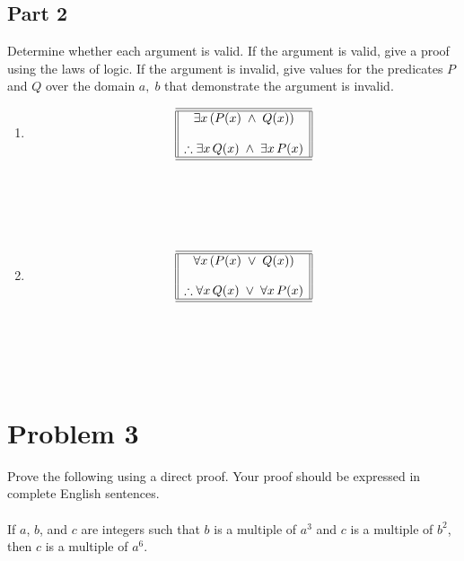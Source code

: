 \documentclass{amsart}
\theoremstyle{definition}
\theoremstyle{Exercise}
\theoremstyle{remark}
\theoremstyle{rule}
\numberwithin{equation}{section}
\begin{document}
 \subsection*{Part 2}
Determine whether each argument is valid. If the argument is valid, give a proof using the laws of logic. If the argument is invalid, give values for the predicates $P$ and $Q$ over the domain ${a,\; b}$ that demonstrate the argument is invalid.\\
 \begin{enumerate}[label=(\alph*)]
\item \[
\begin{array}{||c||}
\hline \hline
\exists x\, (P(x)\; \land \;Q(x) )\\
\\
\therefore \exists x\, Q(x)\; \land\; \exists x \,P(x) \\
\hline \hline
\end{array}
\]\\\\
 \\\\


\item \[
\begin{array}{||c||}
\hline \hline
\forall x\, (P(x)\; \lor \;Q(x) )\\
\\
\therefore \forall x\, Q(x)\; \lor \; \forall x\, P(x) \\
\hline \hline
\end{array}
\]\\\\
 \\\\
 \end{enumerate}
 \newpage


\section*{Problem 3}

Prove the following using a direct proof. Your proof should be expressed in complete English sentences.
\\\\

If $a$, $b$, and $c$ are integers such that $b$ is a multiple of $a^3$ and $c$ is a multiple of $b^2$, then $c$ is a multiple of $a^6$.
\\\\
\\\\
\end{document}
